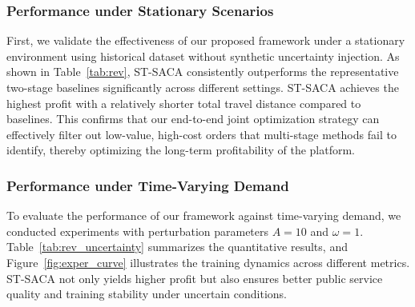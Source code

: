 \documentclass[lettersize,journal]{IEEEtran}
\begin{document}
\color{blue}
\subsubsection{Performance under Stationary Scenarios}
First, we validate the effectiveness of our proposed framework under a stationary environment using historical dataset without synthetic uncertainty injection. As shown in Table~\ref{tab:rev}, ST-SACA consistently outperforms the representative two-stage baselines significantly across different settings. ST-SACA achieves the highest profit with a relatively shorter total travel distance compared to baselines. This confirms that our end-to-end joint optimization strategy can effectively filter out low-value, high-cost orders that multi-stage methods fail to identify, thereby optimizing the long-term profitability of the platform.

\begin{table}[htbp]
\caption{\textcolor{blue}{Performance Comparison under Stationary Scenario}}
\label{tab:rev}
\begin{center}
\color{blue}
\end{center}
\end{table}

\color{blue}

\subsubsection{Performance under Time-Varying Demand}
To evaluate the performance of our framework against time-varying demand, we conducted experiments with perturbation parameters $A=10$ and $\omega=1$. Table~\ref{tab:rev_uncertainty} summarizes the quantitative results, and Figure~\ref{fig:exper_curve} illustrates the training dynamics across different metrics. ST-SACA not only yields higher profit but also ensures better public service quality and training stability under uncertain conditions.
\end{document}
